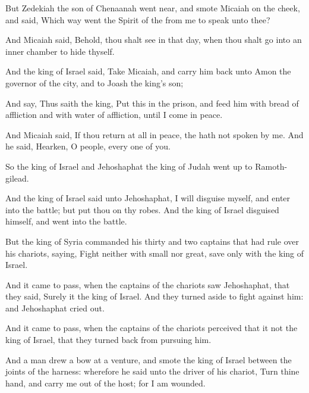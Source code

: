 {But
Zedekiah the
son of
Chenaanah went
near, and
smote
Micaiah on the
cheek, and
said, Which
way
went the
Spirit of the
{} from me to
speak unto thee?

And
Micaiah
said, Behold, thou shalt
see in that
day, when thou shalt
go into an
inner
chamber to
hide thyself.

And the
king of
Israel
said,
Take
Micaiah, and carry him
back unto
Amon the
governor of the
city, and to
Joash the
king’s
son;

And
say, Thus
saith the
king,
Put this
{} in the
prison, and
feed him with
bread of
affliction and with
water of
affliction, until I
come in
peace.

And
Micaiah
said, If thou
return at
all in
peace, the
{} hath not
spoken by me. And he
said,
Hearken, O
people, every one of you.


\par }{\PP {}So the
king of
Israel and
Jehoshaphat the
king of
Judah went
up to
Ramoth-gilead.

And the
king of
Israel
said unto
Jehoshaphat, I will
disguise myself, and
enter into the
battle; but put thou
on thy
robes. And the
king of
Israel
disguised himself, and
went into the
battle.

But the
king of
Syria
commanded his
thirty and
two
captains that had rule over his
chariots,
saying,
Fight neither with
small nor
great, save only with the
king of
Israel.

And it came to pass, when the
captains of the
chariots
saw
Jehoshaphat, that they
said, Surely it
{} the
king of
Israel. And they turned
aside to
fight against him: and
Jehoshaphat cried
out.

And it came to pass, when the
captains of the
chariots
perceived that it
{} not the
king of
Israel, that they turned
back from
pursuing him.

And a
{}
man
drew a
bow at a
venture, and
smote the
king of
Israel between the
joints of the
harness: wherefore he
said unto the driver of his
chariot,
Turn thine
hand, and carry me
out of the
host; for I am
wounded.

}
